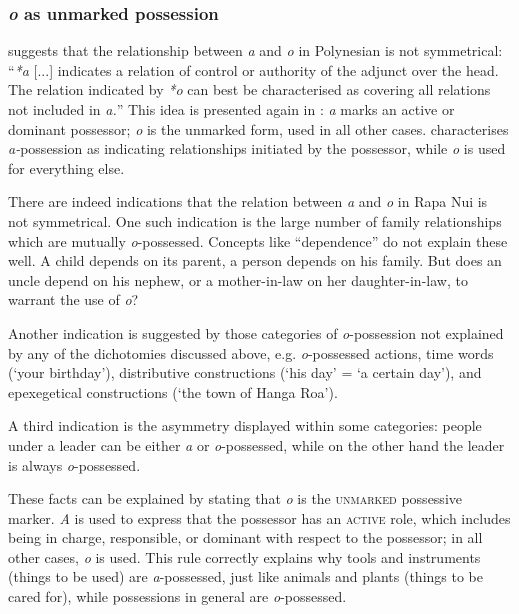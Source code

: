 \subsubsection[o as unmarked possession]{\textit{o} as unmarked possession}\label{sec:6.3.4.3}

\citet[44]{Clark1976} suggests that the relationship between \textit{a} and \textit{o} in Polynesian is not symmetrical: “\textit{*a} [...] indicates a relation of control or authority of the adjunct over the head. The relation indicated by \textit{*o} can best be characterised as covering all relations not included in \textit{a.}” This idea is presented again in \citet{Biggs2000}: \textit{a} marks an active or dominant possessor; \textit{o} is the unmarked form, used in all other cases. \citet[16]{Wilson1982} characterises \textit{a-}possession as indicating relationships initiated by the possessor, while \textit{o} is used for everything else.

There are indeed indications that the relation between \textit{a} and \textit{o} in Rapa Nui is not symmetrical. One such indication is the large number of family relationships which are mutually \textit{o}{}-possessed. Concepts like “dependence” do not explain these well. A child depends on its parent, a person depends on his family. But does an uncle depend on his nephew, or a mother-in-law on her daughter-in-law, to warrant the use of \textit{o}? 

Another indication is suggested by those categories of \textit{o}{}-possession not explained by any of the dichotomies discussed above, e.g. \textit{o}{}-possessed actions, time words (‘your birthday’), distributive constructions (‘his day’ = ‘a certain day’), and epexegetical constructions (‘the town of Hanga Roa’). 

A third indication is the asymmetry displayed within some categories: people under a leader can be either \textit{{\ꞌ}a} or \textit{o}{}-possessed, while on the other hand the leader is always \textit{o}{}-possessed.

These facts can be explained by stating that \textit{o} is the \textsc{unmarked} possessive marker. \textit{{\ꞌ}A} is used to express that the possessor has an \textsc{active} role, which includes being in charge, responsible, or dominant with respect to the possessor; in all other cases, \textit{o} is used. This rule correctly explains why tools and instruments (things to be used) are \textit{a}{}-possessed, just like animals and plants (things to be cared for), while possessions in general are \textit{o}{}-possessed.

